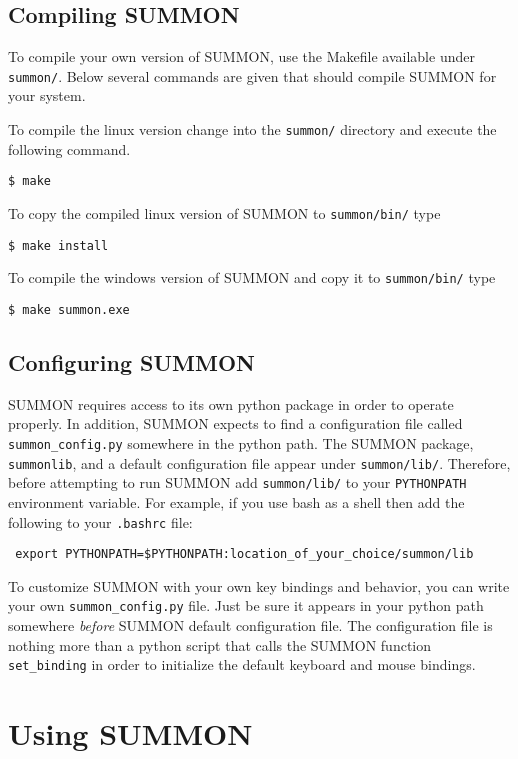 \documentclass[12pt]{article}
\newcommand{\code}[1]{{\tt #1}}
\newcommand{\codeblock}[1]{\vspace{.1in} {\tt #1} \vspace{.1in}}
\begin{document}
\subsection{Compiling SUMMON}

To compile your own version of SUMMON, use the Makefile available under 
\code{summon/}.  Below several commands are given that should compile SUMMON for
your system.

To compile the linux version change into the \code{summon/} directory and
execute the following command.

\codeblock{\$ make}

To copy the compiled linux version of SUMMON to \code{summon/bin/} type

\codeblock{\$ make install}

To compile the windows version of SUMMON and copy it to \code{summon/bin/} type

\codeblock{\$ make summon.exe}



\subsection{Configuring SUMMON}

SUMMON requires access to its own python package in order to operate properly.
In addition, SUMMON expects to find a configuration file called 
\code{summon\_config.py} somewhere in the python path.  The SUMMON package, 
\code{summonlib}, and a default configuration file appear under 
\code{summon/lib/}.  Therefore, before attempting to run SUMMON add 
\code{summon/lib/} to your \code{PYTHONPATH} environment variable.  For example,
if you use bash as a shell then add the following to your \code{.bashrc} file:

\codeblock{
    export PYTHONPATH=\$PYTHONPATH:location\_of\_your\_choice/summon/lib
}

To customize SUMMON with your own key bindings and behavior, you can write your
own \code{summon\_config.py} file.  Just be sure it appears in your python path
somewhere {\em before} SUMMON default configuration file.  The configuration file
is nothing more than a python script that calls the SUMMON function 
\code{set\_binding} in order to initialize the default keyboard and mouse 
bindings.



\section{Using SUMMON}
\label{sec:using}
\end{document}
